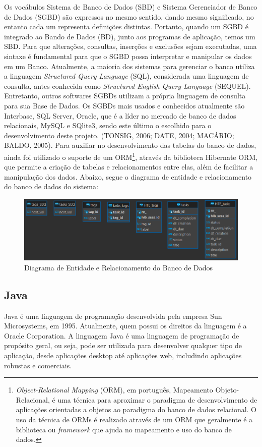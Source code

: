 \documentclass[a4paper,12pt]{article}
\begin{document}
Os vocábulos Sistema de Banco de Dados (SBD) e Sistema Gerenciador de Banco de Dados (SGBD) são expressos no mesmo sentido, dando mesmo 
significado, no entanto cada um representa definições distintas. Portanto, quando um SGBD é integrado ao Bando de Dados (BD), junto aos 
programas de aplicação, temos um SBD. Para que alterações, consultas, inserções e exclusões sejam executadas, uma sintaxe é fundamental 
para que o SGBD possa interpretar e manipular os dados em um Banco. Atualmente, a maioria dos sistemas para gerenciar o banco utiliza a 
linguagem \textit{Structured Query Language} (SQL), considerada uma linguagem de consulta, antes conhecida 
como \textit{Structured English Query Language} (SEQUEL). Entretanto, outros softwares SGBDs utilizam a própria linguagem de 
consulta para sua Base de Dados. Os SGBDs mais usados e 
conhecidos atualmente são Interbase, SQL Server, Oracle, que é a líder no mercado de banco de dados relacionais, 
MySQL e SQlite3, sendo este último o escolhido para o desenvolvimento deste projeto. (TONSIG, 2006; DATE, 2004; MACÁRIO; BALDO, 2005). 
Para auxiliar no desenvolvimento das tabelas do banco de dados, ainda foi utilizado o suporte de um ORM\footnote{
	\textit{Object-Relational Mapping} (ORM), em português, Mapeamento Objeto-Relacional, é uma técnica para aproximar o paradigma de desenvolvimento de aplicações orientadas a objetos ao paradigma do banco de dados relacional. O uso da técnica de ORMs é realizado através de um ORM que geralmente é a biblioteca ou \textit{framework} que ajuda no mapeamento e uso do banco de dados.
}, através da biblioteca Hibernate ORM, que permite a criação de tabelas e relacionamentos entre elas, além de facilitar a manipulação dos dados. Abaixo, segue o diagrama de entidade e relacionamento do banco de dados do sistema:
\begin{figure}[H]
	\centering
	\includegraphics[scale=0.80]{database/database-diagram.png}
	\caption{Diagrama de Entidade e Relacionamento do Banco de Dados}
\end{figure}


\subsection{Java}
Java é uma linguagem de programação desenvolvida pela empresa Sun Microsystems, em 1995. Atualmente, quem possui os direitos da 
linguagem é a Oracle Corporation. A linguagem Java é uma linguagem de programação de propósito geral, ou seja, pode ser utilizada 
para desenvolver qualquer tipo de aplicação, desde aplicações desktop até aplicações web, includindo aplicações robustas e comerciais.
\end{document}
